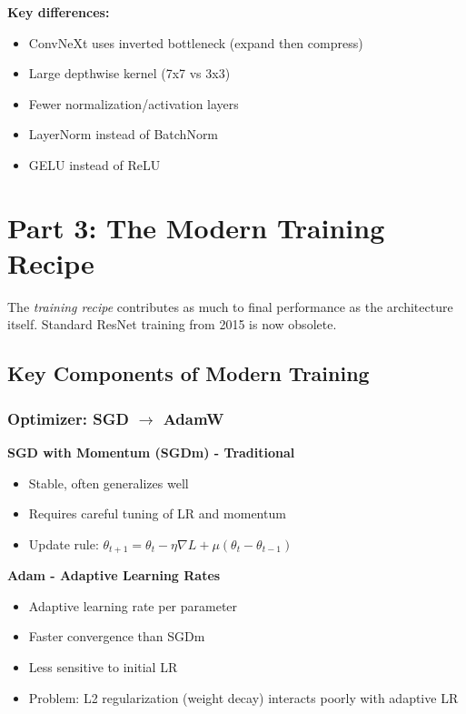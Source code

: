 \documentclass{article}
\begin{document}
\textbf{Key differences:}
\begin{itemize}
    \item ConvNeXt uses inverted bottleneck (expand then compress)
    \item Large depthwise kernel (7x7 vs 3x3)
    \item Fewer normalization/activation layers
    \item LayerNorm instead of BatchNorm
    \item GELU instead of ReLU
\end{itemize}

\section{Part 3: The Modern Training Recipe}

\begin{tcolorbox}[colback=green!5!white, colframe=green!75!black, title=Critical Insight]
The \textit{training recipe} contributes as much to final performance as the architecture itself. Standard ResNet training from 2015 is now obsolete.
\end{tcolorbox}

\subsection{Key Components of Modern Training}

\subsubsection{Optimizer: SGD $\rightarrow$ AdamW}

\textbf{SGD with Momentum (SGDm) - Traditional}
\begin{itemize}
    \item Stable, often generalizes well
    \item Requires careful tuning of LR and momentum
    \item Update rule: $\theta_{t+1} = \theta_t - \eta \nabla L + \mu (\theta_t - \theta_{t-1})$
\end{itemize}

\textbf{Adam - Adaptive Learning Rates}
\begin{itemize}
    \item Adaptive learning rate per parameter
    \item Faster convergence than SGDm
    \item Less sensitive to initial LR
    \item Problem: L2 regularization (weight decay) interacts poorly with adaptive LR
\end{itemize}
\end{document}
